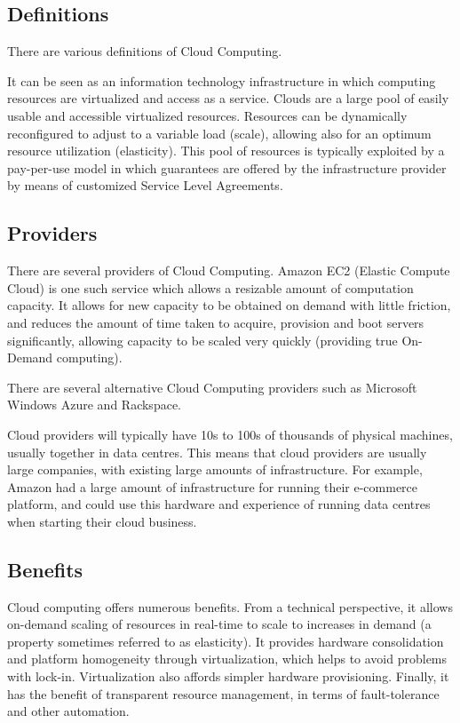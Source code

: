 \documentclass{article}
\begin{document}
\subsection{Definitions}
There are various definitions of Cloud Computing.

It can be seen as an information technology infrastructure in which computing resources are virtualized and access as a service. Clouds are a large pool of easily usable and accessible virtualized resources. Resources can be dynamically reconfigured to adjust to a variable load (scale), allowing also for an optimum resource utilization (elasticity). This pool of resources is typically exploited by a pay-per-use model in which guarantees are offered by the infrastructure provider by means of customized Service Level Agreements.

\subsection{Providers}
There are several providers of Cloud Computing. Amazon EC2 (Elastic Compute Cloud) is one such service which allows a resizable amount of computation capacity. It allows for new capacity to be obtained on demand with little friction, and reduces the amount of time taken to acquire, provision and boot servers significantly, allowing capacity to be scaled very quickly (providing true On-Demand computing). 

There are several alternative Cloud Computing providers such as Microsoft Windows Azure and Rackspace. 

Cloud providers will typically have 10s to 100s of thousands of physical machines, usually together in data centres. This means that cloud providers are usually large companies, with existing large amounts of infrastructure. For example, Amazon had a large amount of infrastructure for running their e-commerce platform, and could use this hardware and experience of running data centres when starting their cloud business.

\subsection{Benefits}
Cloud computing offers numerous benefits. From a technical perspective, it allows on-demand scaling of resources in real-time to scale to increases in demand (a property sometimes referred to as elasticity). It provides hardware consolidation and platform homogeneity through virtualization, which helps to avoid problems with lock-in. Virtualization also affords simpler hardware provisioning. Finally, it has the benefit of transparent resource management, in terms of fault-tolerance and other automation.
\end{document}
